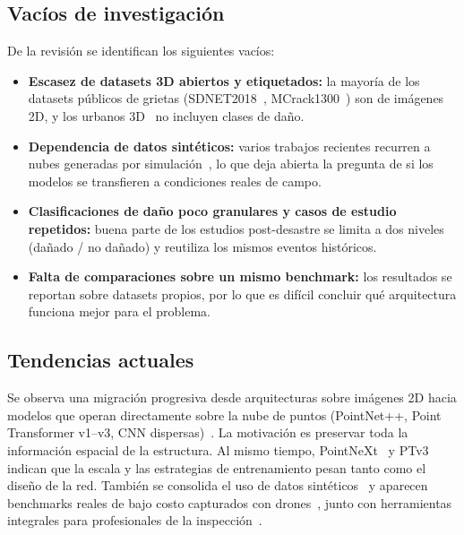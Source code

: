 \documentclass[5p]{elsarticle}
\begin{document}
\subsection{Vacíos de investigación}

De la revisión se identifican los siguientes vacíos:
\begin{itemize}
    \item \textbf{Escasez de datasets 3D abiertos y etiquetados:} la mayoría de los datasets públicos de grietas (SDNET2018~\cite{Dorafshan2018}, MCrack1300~\cite{Ye2024}) son de imágenes 2D, y los urbanos 3D~\cite{Hu2022} no incluyen clases de daño.
    \item \textbf{Dependencia de datos sintéticos:} varios trabajos recientes recurren a nubes generadas por simulación~\cite{Zahs2023,Jing2024,Jing2022,Yang2023}, lo que deja abierta la pregunta de si los modelos se transfieren a condiciones reales de campo.
    \item \textbf{Clasificaciones de daño poco granulares y casos de estudio repetidos:} buena parte de los estudios post-desastre se limita a dos niveles (dañado / no dañado) y reutiliza los mismos eventos históricos.
    \item \textbf{Falta de comparaciones sobre un mismo benchmark:} los resultados se reportan sobre datasets propios, por lo que es difícil concluir qué arquitectura funciona mejor para el problema.
\end{itemize}

\subsection{Tendencias actuales}

Se observa una migración progresiva desde arquitecturas sobre imágenes 2D hacia modelos que operan directamente sobre la nube de puntos (PointNet++, Point Transformer v1--v3, CNN dispersas)~\cite{Qi2017b,Wu2024,Peng2024}. La motivación es preservar toda la información espacial de la estructura. Al mismo tiempo, PointNeXt~\cite{Qian2022} y PTv3~\cite{Wu2024} indican que la escala y las estrategias de entrenamiento pesan tanto como el diseño de la red. También se consolida el uso de datos sintéticos~\cite{Zahs2023,Jing2024} y aparecen benchmarks reales de bajo costo capturados con drones~\cite{Le2026,Rahnemoonfar2023}, junto con herramientas integrales para profesionales de la inspección~\cite{SanchezAparicio2025}.

\end{document}
